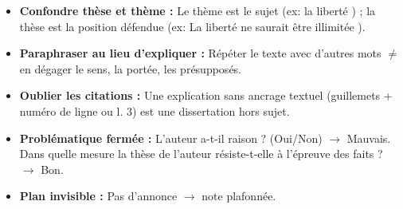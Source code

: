 \documentclass[11pt]{article}
\begin{document}
\begin{attention}
\begin{itemize}
\item \textbf{Confondre thèse et thème :} Le thème est le sujet (ex: \og la liberté \fg) ; la thèse est la position défendue (ex: \og La liberté ne saurait être illimitée \fg).
\item \textbf{Paraphraser au lieu d'expliquer :} Répéter le texte avec d'autres mots $\neq$ en dégager le sens, la portée, les présupposés.
\item \textbf{Oublier les citations :} Une explication sans ancrage textuel (guillemets + numéro de ligne ou \og l. 3\fg) est une dissertation hors sujet.
\item \textbf{Problématique fermée :} \og L'auteur a-t-il raison ? \fg (Oui/Non) $\rightarrow$ Mauvais. \og Dans quelle mesure la thèse de l'auteur résiste-t-elle à l'épreuve des faits ? \fg $\rightarrow$ Bon.
\item \textbf{Plan invisible :} Pas d'annonce $\rightarrow$ note plafonnée.
\end{itemize}
\end{attention}
\end{document}
